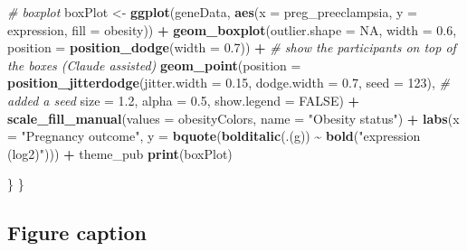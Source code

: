 \documentclass[
]{article}
\newenvironment{Shaded}{\begin{snugshade}}{\end{snugshade}}
\newcommand{\AttributeTok}[1]{\textcolor[rgb]{0.13,0.29,0.53}{#1}}
\newcommand{\CommentTok}[1]{\textcolor[rgb]{0.56,0.35,0.01}{\textit{#1}}}
\newcommand{\ConstantTok}[1]{\textcolor[rgb]{0.56,0.35,0.01}{#1}}
\newcommand{\DecValTok}[1]{\textcolor[rgb]{0.00,0.00,0.81}{#1}}
\newcommand{\FloatTok}[1]{\textcolor[rgb]{0.00,0.00,0.81}{#1}}
\newcommand{\FunctionTok}[1]{\textcolor[rgb]{0.13,0.29,0.53}{\textbf{#1}}}
\newcommand{\NormalTok}[1]{#1}
\newcommand{\OtherTok}[1]{\textcolor[rgb]{0.56,0.35,0.01}{#1}}
\newcommand{\SpecialCharTok}[1]{\textcolor[rgb]{0.81,0.36,0.00}{\textbf{#1}}}
\newcommand{\StringTok}[1]{\textcolor[rgb]{0.31,0.60,0.02}{#1}}
\begin{document}
\begin{Shaded}
\begin{Highlighting}[]
    \CommentTok{\# boxplot}
\NormalTok{    boxPlot }\OtherTok{\textless{}{-}} \FunctionTok{ggplot}\NormalTok{(geneData, }\FunctionTok{aes}\NormalTok{(}\AttributeTok{x =}\NormalTok{ preg\_preeclampsia, }\AttributeTok{y =}\NormalTok{ expression, }\AttributeTok{fill =}\NormalTok{ obesity)) }\SpecialCharTok{+}
      \FunctionTok{geom\_boxplot}\NormalTok{(}\AttributeTok{outlier.shape =} \ConstantTok{NA}\NormalTok{, }\AttributeTok{width =} \FloatTok{0.6}\NormalTok{,}
                   \AttributeTok{position =} \FunctionTok{position\_dodge}\NormalTok{(}\AttributeTok{width =} \FloatTok{0.7}\NormalTok{)) }\SpecialCharTok{+}
      \CommentTok{\# show the participants on top of the boxes (Claude assisted)}
      \FunctionTok{geom\_point}\NormalTok{(}\AttributeTok{position =} \FunctionTok{position\_jitterdodge}\NormalTok{(}\AttributeTok{jitter.width =} \FloatTok{0.15}\NormalTok{,}
                                                 \AttributeTok{dodge.width =} \FloatTok{0.7}\NormalTok{,}
                                                 \AttributeTok{seed =} \DecValTok{123}\NormalTok{),  }\CommentTok{\# added a seed}
                 \AttributeTok{size =} \FloatTok{1.2}\NormalTok{, }\AttributeTok{alpha =} \FloatTok{0.5}\NormalTok{, }\AttributeTok{show.legend =} \ConstantTok{FALSE}\NormalTok{) }\SpecialCharTok{+}
      \FunctionTok{scale\_fill\_manual}\NormalTok{(}\AttributeTok{values =}\NormalTok{ obesityColors, }\AttributeTok{name =} \StringTok{"Obesity status"}\NormalTok{) }\SpecialCharTok{+}
      \FunctionTok{labs}\NormalTok{(}\AttributeTok{x =} \StringTok{"Pregnancy outcome"}\NormalTok{, }\AttributeTok{y =} \FunctionTok{bquote}\NormalTok{(}\FunctionTok{bolditalic}\NormalTok{(.(g)) }\SpecialCharTok{\textasciitilde{}} \FunctionTok{bold}\NormalTok{(}\StringTok{"expression (log2)"}\NormalTok{))) }\SpecialCharTok{+}
\NormalTok{      theme\_pub}
    \FunctionTok{print}\NormalTok{(boxPlot)}

\NormalTok{  \}}
\NormalTok{\}    }
\end{Highlighting}
\end{Shaded}

\subsection{Figure caption}\label{figure-caption}
\end{document}
